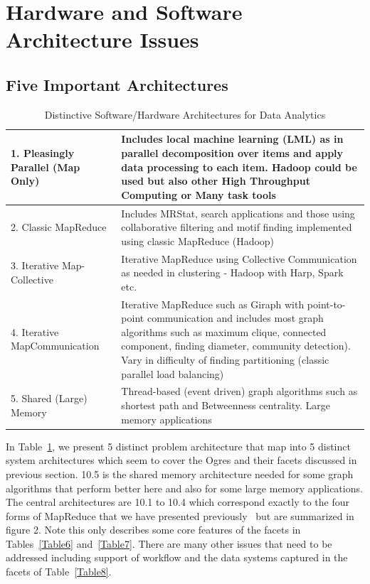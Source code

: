 \documentclass{acm_proc_article-sp}
\begin{document}
\section{Hardware and Software Architecture Issues}
\subsection{Five Important Architectures}

\begin{table}[h]
\centering
\caption{Distinctive Software/Hardware Architectures for Data Analytics}
\label{Table10}
\begin{tabular}{|p{2.55cm}|p{5.45cm}|} \hline
1. Pleasingly Parallel (Map Only) & Includes local machine learning (LML) as in parallel decomposition over items and apply data processing to each item. Hadoop could be used but also other High Throughput Computing or Many task tools \\ \hline
2. Classic Map\-Reduce & Includes MRStat, search applications and those using collaborative filtering and motif finding implemented using classic MapReduce (Hadoop)\\ \hline
3. Iterative Map-Collective & Iterative MapReduce using Collective Communication as needed in clustering - Hadoop with Harp, Spark etc. \\ \hline
4. Iterative Map\-Communi\-cation & Iterative MapReduce such as Giraph with point-to-point communication and includes most graph algorithms such as maximum clique,  connected component, finding diameter, community detection). Vary in difficulty of finding partitioning (classic parallel load balancing)\\ \hline
5. Shared (Lar\-ge) Memory & Thread-based (event driven) graph algorithms such as shortest path and Betweenness centrality. Large memory applications
 
\\ \hline
\end{tabular}
\end{table}

In Table~\ref{Table10}, we present 5 distinct problem architecture that map into 5 distinct system architectures which seem to cover the Ogres and their facets discussed in previous section. 10.5 is the shared memory architecture needed for some graph algorithms that perform better here and also for some large memory applications. The central architectures are 10.1 to 10.4 which correspond exactly to the four forms of MapReduce that we have presented previously~\cite{b18} but are summarized in figure 2. Note this only describes some core features of the facets in Tables~\ref{Table6} and~\ref{Table7}. There are many other issues that need to be addressed including support of workflow and the data systems captured in the facets of Table~\ref{Table8}.
\end{document}
